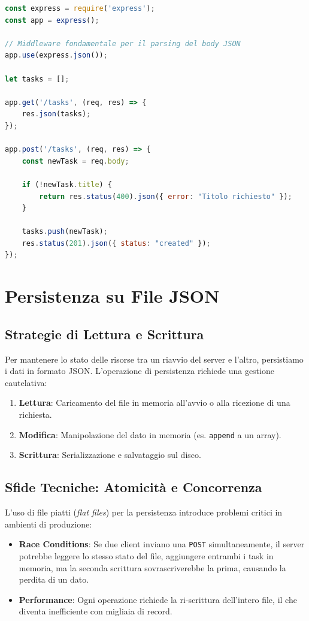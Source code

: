 \documentclass[11pt,a4paper]{report}
\begin{document}
\begin{lstlisting}[language=javascript, caption=Implementazione REST in Express]
const express = require('express');
const app = express();

// Middleware fondamentale per il parsing del body JSON
app.use(express.json());

let tasks = [];

app.get('/tasks', (req, res) => {
    res.json(tasks);
});

app.post('/tasks', (req, res) => {
    const newTask = req.body;
    
    if (!newTask.title) {
        return res.status(400).json({ error: "Titolo richiesto" });
    }
    
    tasks.push(newTask);
    res.status(201).json({ status: "created" });
});
\end{lstlisting}


\chapter{Persistenza su File JSON}

\section{Strategie di Lettura e Scrittura}
Per mantenere lo stato delle risorse tra un riavvio del server e l'altro, persistiamo i dati in formato JSON. L'operazione di persistenza richiede una gestione cautelativa:
\begin{enumerate}
    \item \textbf{Lettura}: Caricamento del file in memoria all'avvio o alla ricezione di una richiesta.
    \item \textbf{Modifica}: Manipolazione del dato in memoria (es. \texttt{append} a un array).
    \item \textbf{Scrittura}: Serializzazione e salvataggio sul disco.
\end{enumerate}

\section{Sfide Tecniche: Atomicità e Concorrenza}
L'uso di file piatti (\textit{flat files}) per la persistenza introduce problemi critici in ambienti di produzione:
\begin{itemize}
    \item \textbf{Race Conditions}: Se due client inviano una \texttt{POST} simultaneamente, il server potrebbe leggere lo stesso stato del file, aggiungere entrambi i task in memoria, ma la seconda scrittura sovrascriverebbe la prima, causando la perdita di un dato.
    \item \textbf{Performance}: Ogni operazione richiede la ri-scrittura dell'intero file, il che diventa inefficiente con migliaia di record.
\end{itemize}
\end{document}
